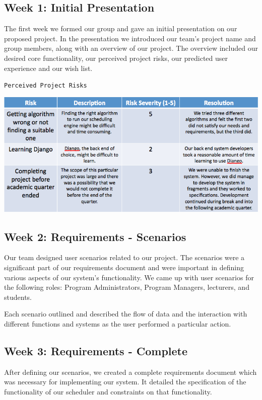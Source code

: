 \documentclass[12pt]{article}
\begin{document}
\begin{enumerate}
\begin{enumerate}
\subsection*{Week 1: Initial Presentation}

The first week we formed our group and gave an initial presentation on our proposed project. In the presentation we introduced our team's project name and group members, along with an overview of our project. The overview included our desired core functionality, our perceived project risks, our predicted user experience and our wish list. 

\begin{center}\texttt{Perceived Project Risks}\end{center}
\includegraphics[scale=0.45]{risktable.png}

\subsection*{Week 2: Requirements - Scenarios}

Our team designed user scenarios related to our project. The scenarios were a significant part of our requirements document and were important in defining various aspects of our system's functionality. We came up with user scenarios for the following roles: Program Administrators, Program Managers, lecturers, and students. 

Each scenario outlined and described the flow of data and the interaction with different functions and systems as the user performed a particular action. 

\subsection*{Week 3: Requirements - Complete}

After defining our scenarios, we created a complete requirements document which was necessary for implementing our system. It detailed the specification of the functionality of our scheduler and constraints on that functionality. 


\end{enumerate}
\end{enumerate}
\end{document}

